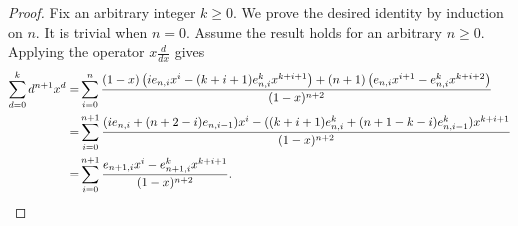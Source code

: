 \documentclass[10pt,a4paper]{amsart}
\begin{document}
\begin{proof}
Fix an arbitrary integer $k\ge0$.
We prove the desired identity by induction on $n$.
It is trivial when $n=0$. 
Assume the result holds for an arbitrary $n\ge0$.
Applying the operator $x\frac{d}{dx}$ gives
\begin{align*}
\sum_{d=0}^k d^{n+1} x^d =& \sum_{i=0}^n \frac{ (1-x) 
\left( ie_{n,i} x^i - (k+i+1) e_{n,i}^k x^{k+i+1} \right) 
+ (n+1) \left( e_{n,i} x^{i+1} - e_{n,i}^k x^{k+i+2} \right) }
{(1-x)^{n+2}} \\
=& \sum_{i=0}^{n+1} \frac{ (ie_{n,i} + (n+2-i)e_{n,i-1})x^i 
- ( (k+i+1)e_{n,i}^k + (n+1-k-i) e_{n,i-1}^k ) x^{k+i+1} } 
{(1-x)^{n+2}} \\
=& \sum_{i=0}^{n+1} \frac{ e_{n+1,i} x^i 
-  e_{n+1,i}^k x^{k+i+1} } {(1-x)^{n+2}}. \qedhere
\end{align*}
\end{proof}
\end{document}
